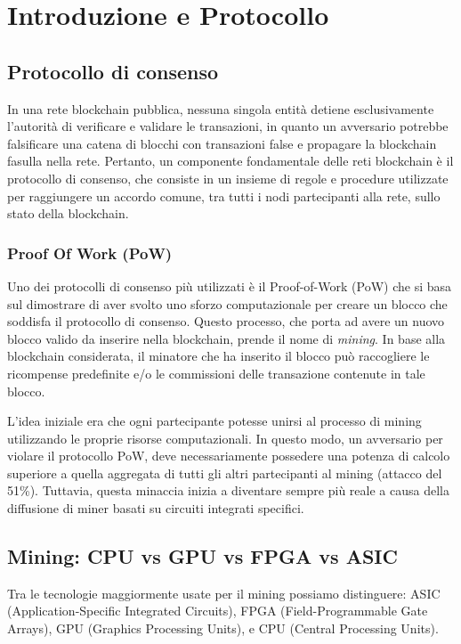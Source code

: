 \chapter{Introduzione e Protocollo}
\section{Protocollo di consenso}
In una rete blockchain pubblica, nessuna singola entità detiene esclusivamente l'autorità di verificare e validare le transazioni, in quanto un avversario potrebbe falsificare una catena di blocchi con transazioni false e propagare la blockchain fasulla nella rete. 
Pertanto, un componente fondamentale delle reti blockchain è il protocollo di consenso, che consiste in un insieme di regole e procedure utilizzate per raggiungere un accordo comune, tra tutti i nodi partecipanti alla rete, sullo stato della blockchain.

\subsection{Proof Of Work (PoW)}
Uno dei protocolli di consenso più utilizzati è il Proof-of-Work (PoW) che si basa sul dimostrare di aver svolto uno sforzo computazionale per creare un blocco che soddisfa il protocollo di consenso. 
Questo processo, che porta ad avere un nuovo blocco valido da inserire nella blockchain, prende il nome di \textit{mining}.
In base alla blockchain considerata, il minatore che ha inserito il blocco può raccogliere le ricompense predefinite e/o le commissioni delle transazione contenute in tale blocco.

L'idea iniziale era che ogni partecipante potesse unirsi al processo di mining utilizzando le proprie risorse computazionali. 
In questo modo, un avversario per violare il protocollo PoW, deve necessariamente possedere una potenza di calcolo superiore a quella aggregata di tutti gli altri partecipanti al mining (attacco del 51\%). 
Tuttavia, questa minaccia inizia a diventare sempre più reale a causa della diffusione di miner basati su circuiti integrati specifici. 


\section{Mining: CPU vs GPU vs FPGA vs ASIC}
Tra le tecnologie maggiormente usate per il mining possiamo distinguere: ASIC (Application-Specific Integrated Circuits), FPGA (Field-Programmable Gate Arrays), GPU (Graphics Processing Units), e CPU (Central Processing Units). 

